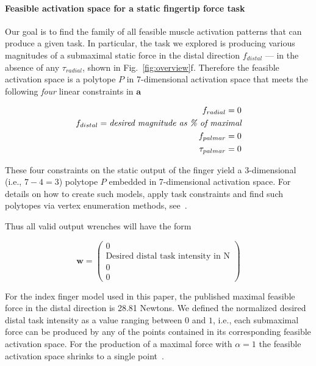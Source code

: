 \documentclass[letterpaper]{article}
\begin{document}
\paragraph*{Feasible activation space for a static fingertip force task}

Our goal is to find the family of all feasible muscle activation patterns that can produce a given task. In particular, the task we explored is producing various magnitudes of a submaximal static force in the distal direction $f_{distal}$ --- in the absence of any $\tau_{radial}$, shown in Fig.~\ref{fig:overview}f. Therefore the feasible activation space is a polytope $P$ in 7-dimensional activation space that meets the following \emph{four} linear constraints in $\textbf{a}$~\cite{Valero-Cuevas1998Large,valero-cuevas2015fundamentals,Valero-Cuevas2000Scaling}

\begin{eqnarray}
f_{radial} = 0 \\
f_{distal} = \emph{desired magnitude as \% of maximal} \\
f_{palmar} = 0 \\
\tau_{palmar} = 0
\end{eqnarray}

These four constraints on the static output of the finger yield a 3-dimensional (i.e., $7-4=3$) polytope $P$ embedded in 7-dimensional activation space.
For details on how to create such models, apply task constraints and find such polytopes via vertex enumeration methods, see~\cite{valero-cuevas2015fundamentals}.

Thus all valid output wrenches will have the form

\begin{equation}
\label{eq:wrench}
\textbf{w}=
\begin{pmatrix}
0\\
\text{Desired distal task intensity in N} \\
0\\
0
\end{pmatrix}
\end{equation}

For the index finger model used in this paper, the published maximal feasible force in the distal direction is 28.81 Newtons. We defined the normalized desired distal task intensity as a value ranging between $0$ and $1$, i.e., each submaximal force can be produced by any of the points contained in its corresponding feasible activation space. For the production of a maximal force with $\alpha=1$ the feasible activation space shrinks to a single point~\cite{spoor1983balancing,Chao1978Graphical,chvatal1983linear,Valero-Cuevas2000Scaling}.
\end{document}
